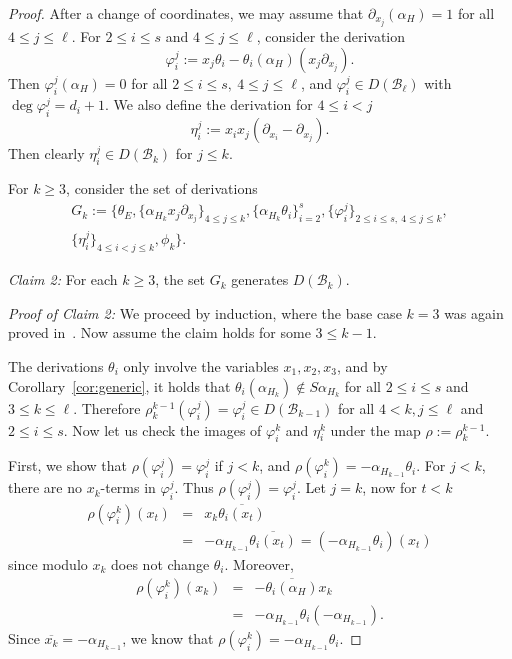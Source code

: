 \documentclass[a4paper,11pt]{amsart}
\def\B{{\mathcal{B}}}%
\numberwithin{equation}{section}
\theoremstyle{remark}
\begin{document}
\begin{proof}
After a change of coordinates, we may assume that $\partial_{x_j}(\alpha_H)=1$ for all $4\le j \le \ell$.
For $2\le i \le s$ and $4\le j\le \ell$, consider the derivation
$$
\varphi_i^j:=x_j \theta_i-\theta_i(\alpha_H) (x_j \partial_{x_{j}}).
$$
Then $\varphi_i^j(\alpha_H)=0$ for all $ 2 \le i \le s,\ 
4 \le j \le \ell$, and $\varphi_i^j \in D(\B_\ell)$ with $\deg \varphi_i^j=d_i+1$.
We also define the derivation for $4 \le i<j$
$$
\eta_i^j:=x_ix_j(\partial_{x_i}-\partial_{x_j}).
$$
Then clearly $\eta_i^j \in D(\B_k)$ for $j \le k$.

For $k\ge 3$, consider the set of derivations
\begin{multline*}
	G_k := \bigg\{\theta_E,\{\alpha_{H_k} x_j \partial_{x_j}\}_{4\le j \le k}, \{\alpha_{H_k} \theta_i\}_{i=2}^s, 
	\{ \varphi_i^j\}_{2 \le i \le s,\ 4\le j \le k}, \\ \{\eta_i^j\}_{4 \le i<j\le k}, \phi_k \bigg\}.
\end{multline*}

\emph{Claim 2:} For each $k\ge 3$, the set $G_k$ generates $D(\B_k)$.

\emph{Proof of Claim 2:} We proceed by induction, where the base case $k=3$ was again proved in~.
Now assume the claim holds for some $3\le k-1$.

The derivations $\theta_i$ only involve the variables $x_1,x_2,x_3$, and by Corollary~\ref{cor:generic}, it holds that $\theta_i(\alpha_{H_k})\notin S\alpha_{H_k}$ for all $2 \le i \le s$ and $3\le k \le \ell$.
Therefore $\rho_k^{k-1}(\varphi_{i}^j)=\varphi_{i}^j \in D(\B_{k-1})$ for all $4< k, j \le \ell$ and $2 \le i \le s$. Now let us check the images of $\varphi_i^k$ and $\eta_i^k$ under the map $\rho:=\rho_k^{k-1}$.

First, we show that $\rho(\varphi_i^j)=\varphi_i^j$ if $j<k$, and 
$\rho(\varphi_i^k)=-\alpha_{H_{k-1}}\theta_i$.
For $j<k$, there are no $x_k$-terms in $\varphi_i^j$. Thus 
$\rho(\varphi_i^j)=\varphi_i^j$. Let $j=k$, now for $t<k$ 
\begin{eqnarray*}
\rho(\varphi_i^k)(x_t)&=&
x_k \overline{\theta_i(x_t)}\\
&=&-\alpha_{H_{k-1}}\overline{\theta_i(x_t)}=(-\alpha_{H_{k-1}} \theta_i)(x_t)
\end{eqnarray*}
since modulo $x_k$ does not change $\theta_i$. Moreover, 
\begin{eqnarray*}
\rho(\varphi_i^k)(x_k)&=&
-\overline{\theta_i(\alpha_H)} x_k\\
&=&-\alpha_{H_{k-1}}\theta_i(-\alpha_{H_{k-1}}).
\end{eqnarray*}
Since $\overline{x_k}=-\alpha_{H_{k-1}}$, we know that 
$\rho(\varphi_i^k)=-\alpha_{H_{k-1}}\theta_i$.


\end{proof}
\end{document}
